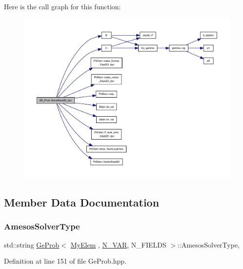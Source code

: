 Here is the call graph for this function\+:
\nopagebreak
\begin{figure}[H]
\begin{center}
\leavevmode
\includegraphics[width=350pt]{classED__Prob_a587cd05e1422af94fadd3eb73a8974b0_cgraph}
\end{center}
\end{figure}


\subsection{Member Data Documentation}
\mbox{\label{classGeProb_a000f412eadf9ce5cf4f5391012283330}} 
\subsubsection{\texorpdfstring{Amesos\+Solver\+Type}{AmesosSolverType}}
{\footnotesize\ttfamily std\+::string \hyperlink{classGeProb}{Ge\+Prob}$<$ \hyperlink{DG__Prob_8h_a83cd887ced9a6587428f267e50cd4787}{My\+Elem} , \hyperlink{classED__Prob_a4e7d2ff1a8e435e336fb00c527224b5a}{N\+\_\+\+V\+AR}, N\+\_\+\+F\+I\+E\+L\+DS $>$\+::Amesos\+Solver\+Type\hspace{0.3cm}{\ttfamily [protected]}, {\ttfamily [inherited]}}



Definition at line 151 of file Ge\+Prob.\+hpp.




